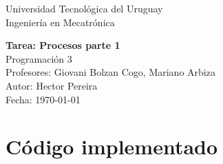 \documentclass[11pt]{article}
\begin{document}
\begin{titlepage}
  \centering
  {\large Universidad Tecnológica del Uruguay \\[0.5cm]}
  {\large Ingeniería en Mecatrónica \\[2cm]}

  {\Huge \textbf{Tarea: Procesos parte 1}}\\[1cm]

  {\Large Programación 3}\\[0.5cm]
  {\Large Profesores: Giovani Bolzan Cogo, Mariano Arbiza}\\[1.5cm]

  \vfill
  {\large Autor: Hector Pereira}\\
  {\large Fecha: \today}
\end{titlepage}






\section{Código implementado}

\end{document}

